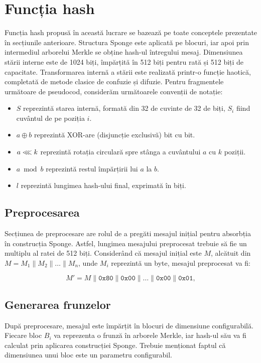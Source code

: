 \section{Funcția hash}

Funcția hash propusă în această lucrare se bazează pe toate conceptele prezentate în secțiunile anterioare.
Structura Sponge este aplicată pe blocuri, iar apoi prin intermediul arborelui Merkle se obține hash-ul întregului mesaj.
Dimensiunea stării interne este de 1024 biți, împărțită în 512 biți pentru rată și 512 biți de capacitate.
Transformarea internă a stării este realizată printr-o funcție haotică, completată de metode clasice de confuzie și difuzie. 
Pentru fragmentele următoare de pseudocod, considerăm următoarele convenții de notație:
\begin{itemize}
    \item $S$ reprezintă starea internă, formată din 32 de cuvinte de 32 de biți, $S_i$ fiind cuvântul de pe poziția $i$.
    \item $a \oplus b$ reprezintă XOR-are (disjuncție exclusivă) bit cu bit.
    \item $a \lll k$ reprezintă rotația circulară spre stânga a cuvântului $a$ cu $k$ poziții.
    \item $a \bmod b$ reprezintă restul împărțirii lui $a$ la $b$.
    \item $l$ reprezintă lungimea hash-ului final, exprimată în biți.
\end{itemize}

\subsection{Preprocesarea}
Secțiunea de preprocesare are rolul de a pregăti mesajul inițial pentru absorbția în construcția Sponge.
Astfel, lungimea mesajului preprocesat trebuie să fie un multiplu al ratei de 512 biți.
Considerând că mesajul inițial este $M$, alcătuit din $M=M_1 \| M_2 \| \ldots \| M_n$, unde $M_i$ reprezintă un byte, mesajul preprocesat va fi:

\begin{equation}
    M' = M \| \texttt{0x80} \| \texttt{0x00} \| \ldots \| \texttt{0x00} \| \texttt{0x01},
\end{equation}

\subsection{Generarea frunzelor}
După preprocesare, mesajul este împărțit în blocuri de dimensiune configurabilă.
Fiecare bloc $B_i$ va reprezenta o frunză în arborele Merkle, iar hash-ul său va fi calculat prin aplicarea construcției Sponge.
Trebuie menționat faptul că dimensiunea unui bloc este un parametru configurabil.

